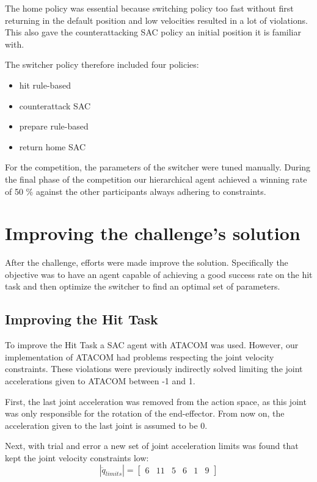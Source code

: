 The home policy was essential because switching policy too fast without first returning in the default position and low velocities resulted in a lot of violations.
This also gave the counterattacking SAC policy an initial position it is familiar with.

The switcher policy therefore included four policies:
\begin{itemize}
    \item hit rule-based
    \item counterattack SAC
    \item prepare rule-based
    \item return home SAC
\end{itemize}

For the competition, the parameters of the switcher were tuned manually.
During the final phase of the competition our hierarchical agent achieved a winning rate of 50 \% against the other participants always adhering to constraints.

\section{Improving the challenge's solution}
After the challenge, efforts were made improve the solution. Specifically the objective was to have an agent capable of achieving a good success rate on the hit task
and then optimize the switcher to find an optimal set of parameters.

\subsection{Improving the Hit Task}
To improve the Hit Task a SAC agent with ATACOM was used. However, our implementation of ATACOM had problems respecting the joint velocity constraints.
These violations were previously indirectly solved limiting the joint accelerations given to ATACOM between -1 and 1.

First, the last joint acceleration was removed from the action space, as this joint was only responsible for the rotation of the end-effector.
From now on, the acceleration given to the last joint is assumed to be 0.

Next, with trial and error a new set of joint acceleration limits was found that kept the joint velocity constraints low:
\begin{equation*}
    |\ddot{q}_{limits}| = \begin{bmatrix} 6 & 11 & 5 & 6 & 1 & 9 \end{bmatrix}
\end{equation*}

